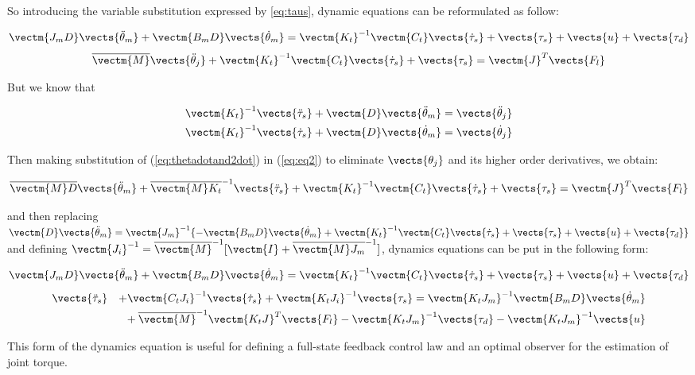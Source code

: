 So introducing the variable substitution expressed by \eqref{eq:taus}, dynamic equations can be reformulated as follow:

\setlength{\arraycolsep}{0.0em}
\begin{eqnarray}
\label{eq:eq1}
\vectm{J_m  D} \vects{\ddot{\theta}_m} + \vectm{B_m  D}  \vects{\dot{\theta}_m} = \vectm{K_t}^{-1} \vectm{C_t} \vects{\dot{\tau}_s} + \vects{\tau_s} + \vects{u} + \vects{\tau_d}
\end{eqnarray}
\begin{eqnarray}
\label{eq:eq2}
\overline{\vectm{M}} \vects{\ddot{\theta}_j}  + \vectm{K_t}^{-1} \vectm{C_t}  \vects{\dot{\tau}_s} + \vects{\tau_s} = \vectm{J}^T  \vects{F_{l}}
\end{eqnarray}
\setlength{\arraycolsep}{5pt}

But we know that

\begin{equation}
\label{eq:thetadotand2dot}
\begin{aligned}
\vectm{K_t}^{-1}\vects{\ddot{\tau}_s} + \vectm{D} \vects{\ddot{\theta}_m}  & =   \vects{\ddot{\theta}_j}  \\
\vectm{K_t}^{-1}\vects{\dot{\tau}_s} + \vectm{D} \vects{\dot{\theta}_m}   & =    \vects{\dot{\theta}_j}  
\end{aligned}
\end{equation}

Then making substitution of (\ref{eq:thetadotand2dot}) in  (\ref{eq:eq2}) to eliminate $ \vects{\theta_j}$ and its higher order derivatives, we obtain:

\begin{equation}
\overline{\vectm{M}  D}\vects{\ddot{\theta}_m } + \overline{\vectm{M} K_t}^{-1} \vects{\ddot{\tau}_s} + \vectm{K_t}^{-1} \vectm{C_t}\vects{\dot{\tau}_s}  + \vects{\tau_s}  =  \vectm{J}^T \vects{F_l}
\end{equation}

and then replacing $\vectm{D}\vects{\ddot{\theta}_m}=\vectm{J_m}^{-1} \{ -\vectm{B_m  D}  \vects{\dot{\theta}_m} + \vectm{K_t}^{-1} \vectm{C_t} \vects{\dot{\tau}_s} + \vects{\tau_s} +\vects{u}  +\vects{\tau_d} \} $
and defining  $\vectm{J_i}^{-1}= \overline{\vectm{M}}^{-1}[\vectm{I} + \overline{\vectm{M} J_m}^{-1}]$,  dynamics equations can be put in the following form:

\setlength{\arraycolsep}{0.0em}
\begin{equation}
\vectm{ J_m  D } \vects{ \ddot{\theta}_m} + \vectm{B_m D}\vects{\dot{\theta}_m} = \vectm{K_t}^{-1} \vectm{C_t}\vects{ \dot{\tau}_s} + \vects{\tau_s} + \vects{u} + \vects{\tau_d}
\label{eq:dynamics_eq1}
\end{equation}
\begin{eqnarray}
\label{eq:dynamics_eq2}
\vects{\ddot{\tau}_s} && + \vectm{C_t J_i}^{-1} \vects{\dot{\tau}_s} + \vectm{K_t J_i}^{-1} \vects{\tau_s} = \vectm{K_t   J_m}^{-1}  \vectm{B_m D}\vects{\dot{\theta}_m} \nonumber \\
&&{+}\:\overline{\vectm{M}}^{-1} \vectm{K_t J}^T \vects{F_l} - \vectm{K_t J_{m}}^{-1} \vects{\tau_d} - \vectm{K_t J_m}^{-1} \vects{u}
\end{eqnarray}
\setlength{\arraycolsep}{5pt}

This form of the dynamics equation is useful for defining a full-state feedback control law and an optimal observer for the estimation of joint torque.

